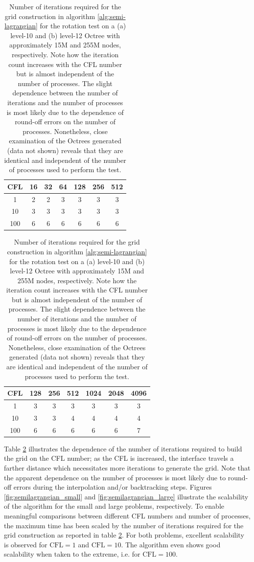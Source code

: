 \begin{table}[htbp]
	\begin{minipage}{.5\linewidth}
		\begin{center}
		\begin{tabular}{|c|cccccc|}
			\hline
				CFL & 16 & 32 & 64 & 128 & 256 & 512 \\
				\hline
				1   & 2 & 2 & 3 & 3 & 3 & 3 \\
				10  & 3 & 3 & 3 & 3 & 3 & 3 \\
				100 & 6 & 6 & 6 & 6 & 6 & 6 \\
			\hline
		\end{tabular}
		\caption*{(a) $l_\text{max} = 10$}
		\end{center}
	\end{minipage}%
	\begin{minipage}{.5\linewidth}
		\begin{center}
		\begin{tabular}{|c|cccccc|}
			\hline
				CFL & 128 & 256 & 512 & 1024 & 2048 & 4096 \\
			\hline
				1   & 3 & 3 & 3 & 3 & 3 & 3 \\
				10  & 3 & 3 & 4 & 4 & 4 & 4 \\
				100 & 6 & 6 & 6 & 6 & 6 & 7 \\
			\hline
		\end{tabular}
		\caption*{(b) $l_\text{max} = 12$}
		\end{center}
	\end{minipage}	
	\caption{Number of iterations required for the grid construction in algorithm \ref{alg:semi-lagrangian} for the rotation test on a (a) level-10 and (b) level-12 Octree with approximately 15M and 255M nodes, respectively. Note how the iteration count increases with the CFL number but is almost independent of the number of processes. The slight dependence between the number of iterations and the number of processes is most likely due to the dependence of round-off errors on the number of processes. Nonetheless, close examination of the Octrees generated (data not shown) reveals that they are identical and independent of the number of processes used to perform the test.}
	\label{tab:semilagrangian}
\end{table}

Table \ref{tab:semilagrangian} illustrates the dependence of the number of iterations required to build the grid on the CFL number; as the CFL is increased, the interface travels a farther distance which necessitates more iterations to generate the grid. Note that the apparent dependence on the number of processes is most likely due to round-off errors during the interpolation and/or backtracking steps. Figures \ref{fig:semilagrangian_small} and \ref{fig:semilagrangian_large} illustrate the scalability of the algorithm for the small and large problems, respectively. To enable meaningful comparisons between different CFL numbers and number of processes, the maximum time has been scaled by the number of iterations required for the grid construction as reported in table \ref{tab:semilagrangian}. For both problems, excellent scalability is observed for $\text{CFL} = 1$ and $\text{CFL} = 10$. The algorithm even shows good scalability when taken to the extreme, i.e. for $\text{CFL} = 100$.

